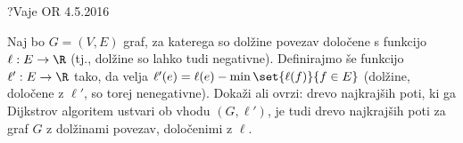 \begin{naloga}{?}{Vaje OR 4.5.2016}
\begin{vprasanje}
Naj bo $G = (V, E)$ graf,
za katerega so dolžine povezav določene s funkcijo $\ell : E \to \R$
(tj., dolžine so lahko tudi negativne).
Definirajmo še funkcijo $\ell' : E \to \R$ tako,
da velja $\ell'(e) = \ell(e) - \min\set{\ell(f)}{f \in E}$
(dolžine, določene z $\ell'$, so torej nenegativne).
Dokaži ali ovrzi: drevo najkrajših poti,
ki ga Dijkstrov algoritem ustvari ob vhodu $(G, \ell')$,
je tudi drevo najkrajših poti za graf $G$ z dolžinami povezav,
določenimi z $\ell$.
\end{vprasanje}
\begin{odgovor}
\end{odgovor}
\end{naloga}
